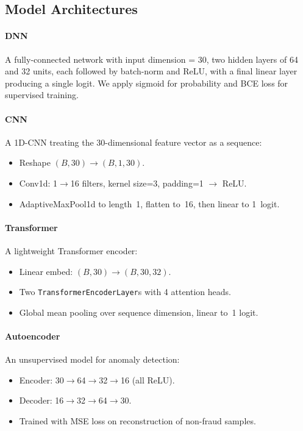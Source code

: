 \documentclass[10pt]{article}
\begin{document}
\subsection*{Model Architectures}
\paragraph{DNN} A fully-connected network with input dimension = 30, two hidden layers of 64 and 32 units, each followed by batch-norm and ReLU, with a final linear layer producing a single logit. We apply sigmoid for probability and BCE loss for supervised training.

\paragraph{CNN} A 1D-CNN treating the 30-dimensional feature vector as a sequence:  
\begin{itemize}
  \item Reshape $(B,30)\to(B,1,30)$.
  \item Conv1d: 1$\to$16 filters, kernel size=3, padding=1 $\to$ ReLU.
  \item AdaptiveMaxPool1d to length 1, flatten to 16, then linear to 1 logit.
\end{itemize}

\paragraph{Transformer} A lightweight Transformer encoder:  
\begin{itemize}
  \item Linear embed: $(B,30)\to(B,30,32)$.
  \item Two \texttt{TransformerEncoderLayer}s with 4 attention heads.
  \item Global mean pooling over sequence dimension, linear to 1 logit.
\end{itemize}

\paragraph{Autoencoder} An unsupervised model for anomaly detection:  
\begin{itemize}
  \item Encoder: 30$\to$64$\to$32$\to$16 (all ReLU).
  \item Decoder: 16$\to$32$\to$64$\to$30.
  \item Trained with MSE loss on reconstruction of non-fraud samples.
\end{itemize}
\end{document}
